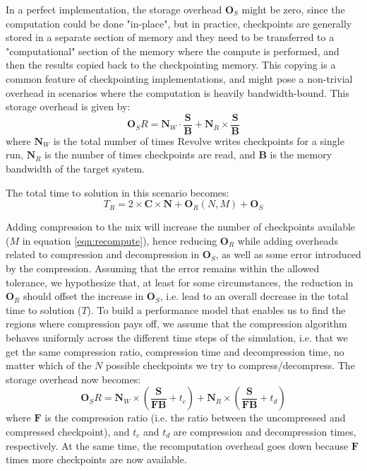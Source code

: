 \documentclass[conference]{IEEEtran}
\begin{document}
In a perfect implementation, the storage overhead $\mathbf{O}_S$ might be zero, since the computation could
be done "in-place", but in practice, checkpoints are generally stored in a separate section of memory and they
need to be transferred to a "computational" section of the memory where the compute is performed, and then
the results copied back to the checkpointing memory. This copying is a common feature of checkpointing
implementations, and might pose a non-trivial overhead in scenarios where the computation is heavily bandwidth-bound. 
This storage overhead is given by:
\begin{equation}
\mathbf{O}_SR = \mathbf{N}_W \cdot \frac{\mathbf{S}}{\mathbf{B}} + \mathbf{N}_R \times \frac{\mathbf{S}}{\mathbf{B}}
\label{eqn:storage}
\end{equation}
where $\mathbf{N}_W$ is the total number of times Revolve writes checkpoints for a single run, $ \mathbf{N}_R$ 
is the number of times checkpoints are read, and $\mathbf{B}$ is the memory bandwidth of the target system. 

The total time to solution in this scenario becomes:
\begin{equation}
T_R = 2 \times \mathbf{C} \times \mathbf{N} + \mathbf{O}_R(N, M) + \mathbf{O}_S
\end{equation}

Adding compression to the mix will increase the number of checkpoints available ($M$ in equation \ref{eqn:recompute}),
hence reducing $\mathbf{O}_R$ while adding overheads related to compression and decompression in $\mathbf{O}_S$,
as well as some error introduced by the compression. Assuming that the error remains within the allowed tolerance,
we hypothesize that, at least for some circumstances, the reduction in $\mathbf{O}_R$ should offset the increase in 
$\mathbf{O}_S$, i.e. lead to an overall decrease in the total time to solution ($T$). To build a performance model that
enables us to find the regions where compression pays off, we assume that the compression algorithm behaves uniformly
across the different time steps of the simulation, i.e. that we get the same compression ratio, compression time and 
decompression time, no matter which of the $N$ possible checkpoints we try to compress/decompress. The storage overhead
now becomes:
\begin{equation}
\mathbf{O}_SR = \mathbf{N}_W \times (\frac{\mathbf{S}}{\mathbf{F}\mathbf{B}} + t_c) + \mathbf{N}_R \times (\frac{\mathbf{S}}{\mathbf{F}\mathbf{B}} + t_d)
\end{equation}
where $\mathbf{F}$ is the compression ratio (i.e. the ratio between the uncompressed and compressed checkpoint), and $t_c$
and $t_d$ are compression and decompression times, respectively. At the same time, the recomputation overhead goes down
because $\mathbf{F}$ times more checkpoints are now available.
\end{document}

